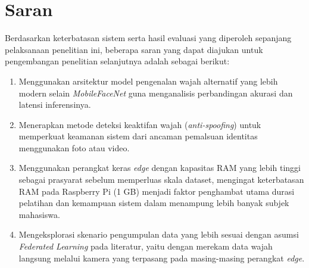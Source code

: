 \section{Saran}
\label{sec:saran}

Berdasarkan keterbatasan sistem serta hasil evaluasi yang diperoleh sepanjang pelaksanaan penelitian ini, beberapa saran yang dapat diajukan untuk pengembangan penelitian selanjutnya adalah sebagai berikut:
\begin{enumerate}[itemsep=1pt]
    \item Menggunakan arsitektur model pengenalan wajah alternatif yang lebih modern selain \textit{MobileFaceNet} guna menganalisis perbandingan akurasi dan latensi inferensinya.
    \item Menerapkan metode deteksi keaktifan wajah (\textit{anti-spoofing}) untuk memperkuat keamanan sistem dari ancaman pemalsuan identitas menggunakan foto atau video.
    \item Menggunakan perangkat keras \textit{edge} dengan kapasitas RAM yang lebih tinggi sebagai prasyarat sebelum memperluas skala dataset, mengingat keterbatasan RAM pada Raspberry Pi (1 GB) menjadi faktor penghambat utama durasi pelatihan dan kemampuan sistem dalam menampung lebih banyak subjek mahasiswa.
    \item Mengeksplorasi skenario pengumpulan data yang lebih sesuai dengan asumsi \textit{Federated Learning} pada literatur, yaitu dengan merekam data wajah langsung melalui kamera yang terpasang pada masing-masing perangkat \textit{edge}.
\end{enumerate}
